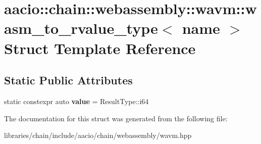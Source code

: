 \hypertarget{structaacio_1_1chain_1_1webassembly_1_1wavm_1_1wasm__to__rvalue__type_3_01name_01_4}{}\section{aacio\+:\+:chain\+:\+:webassembly\+:\+:wavm\+:\+:wasm\+\_\+to\+\_\+rvalue\+\_\+type$<$ name $>$ Struct Template Reference}
\label{structaacio_1_1chain_1_1webassembly_1_1wavm_1_1wasm__to__rvalue__type_3_01name_01_4}
\subsection*{Static Public Attributes}
\begin{DoxyCompactItemize}
\item 
\mbox{\label{structaacio_1_1chain_1_1webassembly_1_1wavm_1_1wasm__to__rvalue__type_3_01name_01_4_a88e36631bddf652165cc4e99103cd5ec}} 
static constexpr auto {\bfseries value} = Result\+Type\+::i64
\end{DoxyCompactItemize}


The documentation for this struct was generated from the following file\+:\begin{DoxyCompactItemize}
\item 
libraries/chain/include/aacio/chain/webassembly/wavm.\+hpp\end{DoxyCompactItemize}

